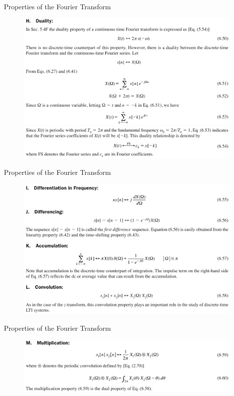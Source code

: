 \documentclass[pdflatex,compress,mathserif]{beamer}
\begin{document}
\begin{frame}{Properties of the Fourier Transform}
	\begin{figure}
		\centering
		\includegraphics[width=\linewidth]{img/img15}
		\includegraphics[width=\linewidth]{img/img16}
	\end{figure}
\end{frame}

\begin{frame}{Properties of the Fourier Transform}
	\begin{figure}
		\centering
		\includegraphics[width=\linewidth]{img/img17}
	\end{figure}
\end{frame}

\begin{frame}{Properties of the Fourier Transform}
	\begin{figure}
		\centering
		\includegraphics[width=\linewidth]{img/img18}
	\end{figure}
\end{frame}
\end{document}
